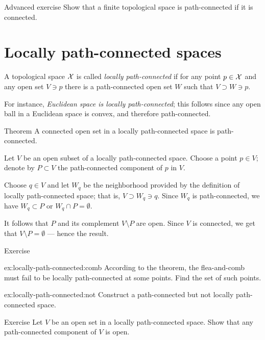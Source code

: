 \begin{thm}{Advanced exercise}\label{ex:finite-connecte}
Show that a finite topological space is path-connected if it is connected.
\end{thm}


\section{Locally path-connected spaces}\label{sec:Locally path-connected spaces}

A topological space $\mathcal{X}$ is called \emph{locally path-connected} if for any point $p\in\mathcal{X}$ and any open set $V\ni p$ there is a path-connected open set $W$ such that $V\supset W\ni p$.

For instance, \textit{Euclidean space is locally path-connected}\/;
this follows since any open ball in a Euclidean space is convex, and therefore path-connected.

\begin{thm}{Theorem}\label{thm:open-connected=path-connected}
A connected open set in a locally path-connected space is path-connected.
\end{thm}

Let $V$ be an open subset of a locally path-connected space.
Choose a point $p\in V$;
denote by $P\subset V$ the path-connected component of $p$ in $V$.

Choose $q\in V$ and let $W_q$ be the neighborhood provided by the definition of locally path-connected space;
that is, $V\supset W_q\ni q$.
Since $W_q$ is path-connected, we have $W_q\subset P$ or $W_q\cap P=\emptyset$.

It follows that $P$ and its complement $V\setminus P$ are open.
Since $V$ is connected, we get that $V\setminus P=\emptyset$ --- hence the result.
\qeds

\begin{thm}{Exercise}\label{ex:locally-path-connected}

\begin{subthm}{ex:locally-path-connected:comb}
According to the theorem, the flea-and-comb must fail to be locally path-connected at some points.
Find the set of such points.
\end{subthm}

\begin{subthm}{ex:locally-path-connected:not}
Construct a path-connected but not locally path-connected space.
\end{subthm}

\end{thm}

\begin{thm}{Exercise}\label{ex:open-path-connected-component}
Let $V$ be an open set in a locally path-connected space.
Show that any path-connected component of $V$ is open.
\end{thm}
